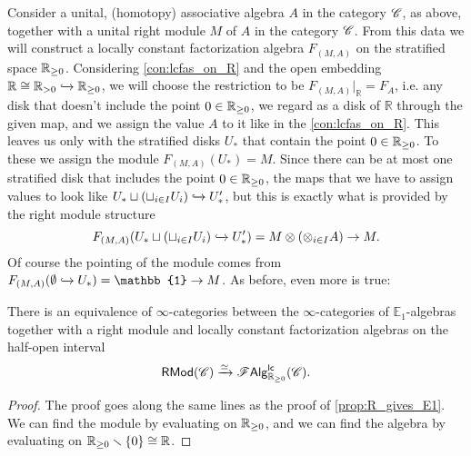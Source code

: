 \documentclass[../text]{subfiles}
\begin{document}
\begin{construction}\label{con:lcfas_on_hoint}
    Consider a unital, (homotopy) associative algebra $A$ in the category $\mathscr{C}$, as above, together with a unital right module $M$ of $A$ in the category $\mathscr{C}$. From this data we will construct a locally constant factorization algebra $F_{(M, A)}$ on the stratified space $\mathbb{R}_{\geq 0}$. Considering \cref{con:lcfas_on_R} and the open embedding $\mathbb{R} \cong \mathbb{R}_{>0} \xhookrightarrow{} \mathbb{R}_{\geq 0}$, we will choose the restriction to be $F_{(M,A)}|_{\mathbb{R}} = F_A$, i.e. any disk that doesn't include the point $0 \in \mathbb{R}_{\geq 0}$, we regard as a disk of $\mathbb{R}$ through the given map, and we assign the value $A$ to it like in the \cref{con:lcfas_on_R}. This leaves us only with the stratified disks $U_*$ that contain the point $0 \in \mathbb{R}_{\geq 0}$. To these we assign the module $F_{(M,A)}(U_*) = M$. Since there can be at most one stratified disk that includes the point $0 \in \mathbb{R}_{\geq 0}$, the maps that we have to assign values to look like $U_* \sqcup (\sqcup_{i \in I} U_i) \xhookrightarrow{} U'_*$, but this is exactly what is provided by the right module structure
    \begin{equation}
        F_{(M,A)} (U_* \sqcup (\sqcup_{i \in I} U_i) \xhookrightarrow{} U'_*) = M \otimes (\otimes_{i \in I} A) \rightarrow M.
    \end{equation}
    Of course the pointing of the module comes from $F_{(M,A)}(\emptyset \xhookrightarrow{} U_*) = \mathbb{1} \rightarrow M$. As before, even more is true:
\end{construction}

\begin{proposition}\label{prop:hoint_gives_modules}
    There is an equivalence of $\infty$-categories between the $\infty$-categories of $\mathbb{E}_1$-algebras together with a right module and locally constant factorization algebras on the half-open interval
    \begin{equation}
        \mathsf{RMod}(\mathscr{C}) \xrightarrow{\simeq} \mathscr{F} \mathsf{Alg}^{\mathsf{lc}}_{\mathbb{R}_{\geq 0}} (\mathscr{C}).
    \end{equation}
\end{proposition}

\begin{proof}
    The proof goes along the same lines as the proof of \cref{prop:R_gives_E1}. We can find the module by evaluating on $\mathbb{R}_{\geq 0}$, and we can find the algebra by evaluating on $\mathbb{R}_{\geq 0} \smallsetminus \{ 0 \} \cong \mathbb{R}$.
\end{proof}
\end{document}
